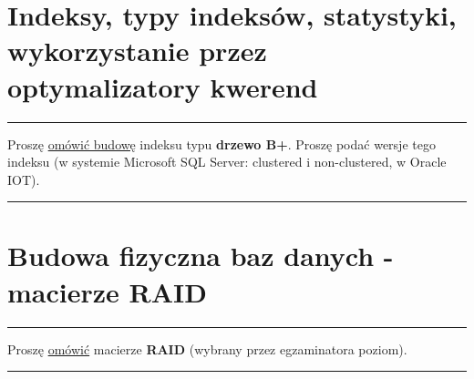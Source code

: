 \documentclass[a5paper,6pt]{article}
\newcommand{\horrule}[1]{\rule{\linewidth}{#1}}
\begin{document}

\pagebreak

    \section{Indeksy, typy indeksów, statystyki, wykorzystanie przez
             optymalizatory kwerend} %
    \label{sec:indeksy}

    \horrule{0.5pt}
    Proszę \underline{omówić budowę} indeksu typu \textbf{drzewo B+}. Proszę
    podać wersje tego indeksu (w systemie Microsoft SQL Server: clustered i
    non-clustered, w Oracle IOT).\\
    \horrule{0.5pt}

\pagebreak


    \section{Budowa fizyczna baz danych - macierze RAID} %
    \label{sec:budowa_fizyczna_baz_danych_macierze_raid}

    \horrule{0.5pt}
    Proszę \underline{omówić} macierze \textbf{RAID} (wybrany przez
    egzaminatora poziom).\\
    \horrule{0.5pt}
\end{document}
